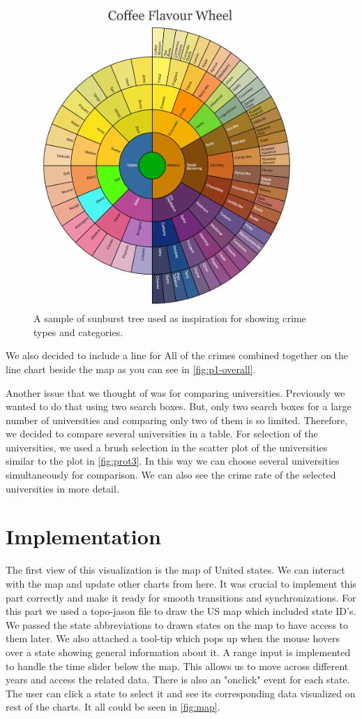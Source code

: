 \documentclass[12pt]{article}
\begin{document}
\begin{figure}[tbph]
   \centering{}
	       \includegraphics[width=4in]{sunburst-ex}           
\caption{A sample of sunburst tree used as inspiration for showing crime types and categories.}
\label{fig:SBchartEx}
\end{figure}

We also decided to include a line for All of the crimes combined together on the line chart beside the map as you can see in \cref{fig:p1-overall}.

Another issue that we thought of was for comparing universities. Previously we wanted to do that using two search boxes. But, only two search boxes for a large number of universities and comparing only two of them is so limited. Therefore, we decided to compare several universities in a table. For selection of the universities, we used a brush selection in the scatter plot of the universities similar to the plot in \cref{fig:prot3}. In this way we can choose several universities simultaneously for comparison. We can also see the crime rate of the selected universities in more detail.


\section{Implementation}
The first view of this visualization is the map of United states. We can interact with the map and update other charts from here. It was crucial to implement this part correctly and make it ready for smooth transitions and synchronizations.
For this part we used a topo-jason file to draw the US map which included state ID's. We passed the state abbreviations to drawn states on the map to have access to them later. We also attached a tool-tip which pops up when the mouse hovers over a state showing general information about it. A range input is implemented to handle the time slider below the map. This allows us to move across different years and access the related data. There is also an "onclick" event for each state. The user can click a state to select it and see its corresponding data visualized on rest of the charts. It all could be seen in \cref{fig:map}.
\end{document}

